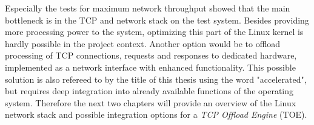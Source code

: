 Especially the tests for maximum network throughput showed that the main bottleneck is in the TCP and network stack on the test system. Besides providing more processing power to the system, optimizing this part of the Linux kernel is hardly possible in the project context. Another option would be to offload processing of TCP connections, requests and responses to dedicated hardware, implemented as a network interface with enhanced functionality. This possible solution is also refereed to by the title of this thesis using the word "accelerated", but requires deep integration into already available functions of the operating system. Therefore the next two chapters will provide an overview of the Linux network stack and possible integration options for a \textit{TCP Offload Engine} (TOE).
